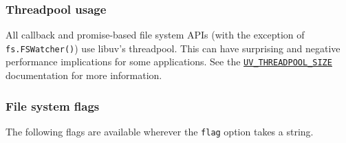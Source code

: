 \begin{Shaded}
\begin{Highlighting}[]
 \OperatorTok{;}

\OperatorTok{;}
\NormalTok{ \{}
\OperatorTok{=}  \NormalTok{(}\OperatorTok{,} \NormalTok{)}\OperatorTok{;}
  \OperatorTok{=} \NormalTok{()}\OperatorTok{;}
\NormalTok{\} }\NormalTok{ \{}
  \NormalTok{()}\OperatorTok{;}
\NormalTok{\}}
\end{Highlighting}
\end{Shaded}

\subsubsection{Threadpool usage}\label{threadpool-usage}

All callback and promise-based file system APIs (with the exception of
\texttt{fs.FSWatcher()}) use libuv's threadpool. This can have
surprising and negative performance implications for some applications.
See the
\href{cli.md\#uv_threadpool_sizesize}{\texttt{UV\_THREADPOOL\_SIZE}}
documentation for more information.

\subsubsection{File system flags}\label{file-system-flags}

The following flags are available wherever the \texttt{flag} option
takes a string.

